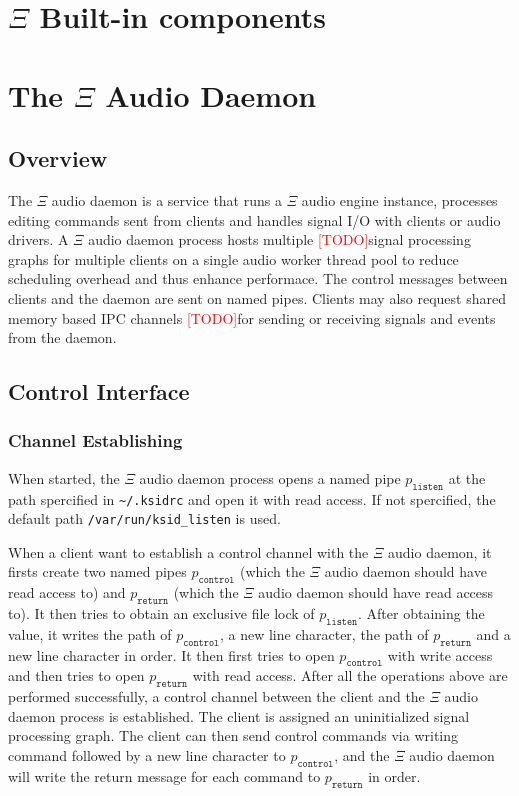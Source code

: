 \documentclass{report}
\newcommand{\Ksi}{$\Xi$ }
\newcommand{\todo}{\textcolor{red}{[TODO]}}
\begin{document}
\chapter{\Ksi Built-in components}
\chapter{The \Ksi Audio Daemon}
\section{Overview}
The \Ksi audio daemon is a service that runs a \Ksi audio engine instance, processes editing commands sent from clients and handles signal I/O with clients or audio drivers. A \Ksi audio daemon process hosts multiple \todo signal processing graphs for multiple clients on a single audio worker thread pool to reduce scheduling overhead and thus enhance performace. The control messages between clients and the daemon are sent on named pipes. Clients may also request shared memory based IPC channels \todo for sending or receiving signals and events from the daemon.
\section{Control Interface}
\subsection{Channel Establishing}
When started, the \Ksi audio daemon process opens a named pipe $p_{\texttt{listen}}$ at the path spercified in \lstinline{~/.ksidrc} and open it with read access. If not spercified, the default path \lstinline{/var/run/ksid_listen} is used.\par
When a client want to establish a control channel with the \Ksi audio daemon, it firsts create two named pipes $p_{\texttt{control}}$ (which the \Ksi audio daemon should have read access to) and $p_{\texttt{return}}$ (which the \Ksi audio daemon should have read access to). It then tries to obtain an exclusive file lock of $p_{\texttt{listen}}$. After obtaining the value, it writes the path of $p_{\texttt{control}}$, a new line character, the path of $p_{\texttt{return}}$ and a new line character in order. It then first tries to open $p_{\texttt{control}}$ with write access and then tries to open $p_{\texttt{return}}$ with read access. After all the operations above are performed successfully, a control channel between the client and the \Ksi audio daemon process is established. The client is assigned an uninitialized signal processing graph. The client can then send control commands via writing command followed by a new line character to $p_{\texttt{control}}$, and the \Ksi audio daemon will write the return message for each command to $p_{\texttt{return}}$ in order.
\end{document}
